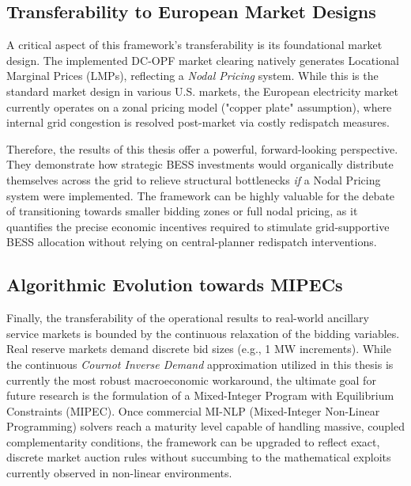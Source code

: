 \subsection{Transferability to European Market Designs}
A critical aspect of this framework's transferability is its foundational market design. The implemented DC-OPF market clearing natively generates Locational Marginal Prices (LMPs), reflecting a \textit{Nodal Pricing} system. While this is the standard market design in various U.S. markets, the European electricity market currently operates on a zonal pricing model ("copper plate" assumption), where internal grid congestion is resolved post-market via costly redispatch measures. 

Therefore, the results of this thesis offer a powerful, forward-looking perspective. They demonstrate how strategic BESS investments would organically distribute themselves across the grid to relieve structural bottlenecks \textit{if} a Nodal Pricing system were implemented. The framework can be highly valuable for the debate of transitioning towards smaller bidding zones or full nodal pricing, as it quantifies the precise economic incentives required to stimulate grid-supportive BESS allocation without relying on central-planner redispatch interventions.

\subsection{Algorithmic Evolution towards MIPECs}
Finally, the transferability of the operational results to real-world ancillary service markets is bounded by the continuous relaxation of the bidding variables. Real reserve markets demand discrete bid sizes (e.g., 1 MW increments). While the continuous \textit{Cournot Inverse Demand} approximation utilized in this thesis is currently the most robust macroeconomic workaround, the ultimate goal for future research is the formulation of a Mixed-Integer Program with Equilibrium Constraints (MIPEC). Once commercial MI-NLP (Mixed-Integer Non-Linear Programming) solvers reach a maturity level capable of handling massive, coupled complementarity conditions, the framework can be upgraded to reflect exact, discrete market auction rules without succumbing to the mathematical exploits currently observed in non-linear environments.

